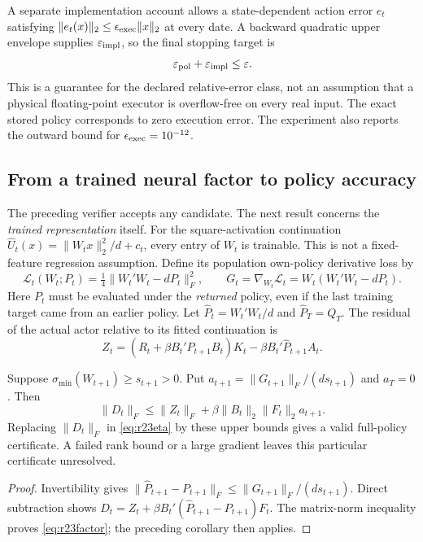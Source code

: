 A separate implementation account allows a state-dependent action error
$e_t$ satisfying $\|e_t(x)\|_2\leq\epsilon_{\rm exec}\|x\|_2$ at every
date. A backward quadratic upper envelope supplies
$\varepsilon_{\rm impl}$, so the final stopping target is
\begin{equation}
 \varepsilon_{\rm pol}+\varepsilon_{\rm impl}\leq\varepsilon.
 \label{eq:r23stop}
\end{equation}
This is a guarantee for the declared relative-error class, not an assumption
that a physical floating-point executor is overflow-free on every real input.
The exact stored policy corresponds to zero execution error. The experiment
also reports the outward bound for $\epsilon_{\rm exec}=10^{-12}$.

\subsection{From a trained neural factor to policy accuracy}
The preceding verifier accepts any candidate. The next result concerns the
\emph{trained representation} itself. For the square-activation continuation
$\widehat U_t(x)=\|W_tx\|_2^2/d+c_t$, every entry of $W_t$ is trainable.
This is not a fixed-feature regression assumption. Define its population
own-policy derivative loss by
\[
 \mathcal L_t(W_t;P_t)=\tfrac14\|W_t'W_t-dP_t\|_F^2,
 \qquad G_t=\nabla_{W_t}\mathcal L_t=W_t(W_t'W_t-dP_t).
\]
Here $P_t$ must be evaluated under the \emph{returned} policy, even if the
last training target came from an earlier policy. Let
$\widehat P_t=W_t'W_t/d$ and $\widehat P_T=Q_T$. The residual of the actual
actor relative to its fitted continuation is
\[
 Z_t=(R_t+\beta B_t'\widehat P_{t+1}B_t)K_t
                   -\beta B_t'\widehat P_{t+1}A_t.
\]

\begin{proposition}\label{prop:r23factor}
Suppose $\sigma_{\min}(W_{t+1})\geq s_{t+1}>0$. Put
$a_{t+1}=\|G_{t+1}\|_F/(ds_{t+1})$ and $a_T=0$. Then
\begin{equation}
 \|D_t\|_F\leq\|Z_t\|_F+
       \beta\|B_t\|_2\|F_t\|_2 a_{t+1}.
 \label{eq:r23factor}
\end{equation}
Replacing $\|D_t\|_F$ in \eqref{eq:r23eta} by these upper bounds gives a
valid full-policy certificate. A failed rank bound or a large gradient
leaves this particular certificate unresolved.
\end{proposition}
\begin{proof}
Invertibility gives
$\|\widehat P_{t+1}-P_{t+1}\|_F
\leq\|G_{t+1}\|_F/(ds_{t+1})$. Direct subtraction shows
$D_t=Z_t+\beta B_t'(\widehat P_{t+1}-P_{t+1})F_t$.
The matrix-norm inequality proves \eqref{eq:r23factor}; the preceding
corollary then applies.
\end{proof}

